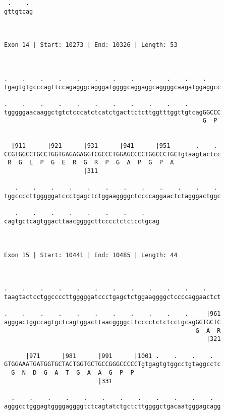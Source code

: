 \documentclass{article}
\begin{document}
\begin{Verbatim}
 .    . 
gttgtcag
        
        
 
Exon 14 | Start: 10273 | End: 10326 | Length: 53



.    .    .    .    .    .    .    .    .    .    .    .    
tgagtgtgcccagttccagagggcagggatggggcaggaggcaggggcaagatggaggcc
                                                            
.    .    .    .    .    .    .    .    .    .    .         
tgggggaacaaggctgtctcccatctcatctgacttctcttggtttggttgtcagGGCCC
                                                       G  P 
                                                            
  
  |911      |921      |931      |941      |951       .    . 
CCGTGGCCTGCCTGGTGAGAGAGGTCGCCCTGGAGCCCCTGGCCCTGCTgtaagtactcc
 R  G  L  P  G  E  R  G  R  P  G  A  P  G  P  A             
                      |311                                  
  
   .    .    .    .    .    .    .    .    .    .    .    . 
tggccccttgggggatccctgagctctggaaggggctccccaggaactctagggactggc
                                                            
   .    .    .    .    .    .    .    .    
cagtgctcagtggacttaacggggcttcccctctctcctgcag
                                           
                                           
 
Exon 15 | Start: 10441 | End: 10485 | Length: 44



.    .    .    .    .    .    .    .    .    .    .    .    
taagtactcctggccccttgggggatccctgagctctggaaggggctccccaggaactct
                                                            
.    .    .    .    .    .    .    .    .    .    .     |961
agggactggccagtgctcagtggacttaacggggcttcccctctctcctgcagGGTGCTC
                                                     G  A  R
                                                        |321
  
      |971      |981      |991      |1001 .    .    .    .  
GTGGAAATGATGGTGCTACTGGTGCTGCCGGGCCCCCTgtgagtgtggcctgtaggcctc
  G  N  D  G  A  T  G  A  A  G  P  P                        
                          |331                              
  
  .    .    .    .    .    .    .    .    .    .    .    .  
agggcctgggagtggggaggggtctcagtatctgctcttggggctgacaatgggagcagg
                                                            

\end{Verbatim}
\end{document}
